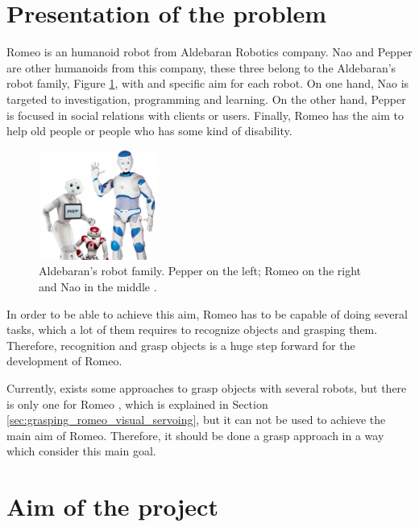 \documentclass[12pt,a4paper,final,twoside,openright]{report}
\begin{document}
\section{Presentation of the problem}

Romeo is an humanoid robot from Aldebaran Robotics company. Nao and Pepper are other humanoids from this company, these three belong to the Aldebaran's robot family, Figure \ref{fig:aldebaran_family}, with and specific aim for each robot. On one hand, Nao is targeted to investigation, programming and learning. On the other hand, Pepper is focused in social relations with clients or users. Finally, Romeo has the aim to help old people or people who has some kind of disability.	

\begin{figure}
	    \centering
		\includegraphics[width=0.35\textwidth]{images/romeo_nao_pepper.jpg}
         \caption{Aldebaran's robot family. Pepper on the left; Romeo on the right and Nao in the middle \autocite{ParPaul}. \label{fig:aldebaran_family}}
\end{figure}

In order to be able to achieve this aim, Romeo has to be capable of doing several tasks, which a lot of them requires to recognize objects and grasping them. Therefore, recognition and grasp objects is a huge step forward for the development of Romeo. 

Currently, exists some approaches to grasp objects with several robots, but there is only one for Romeo  \cite{claudio:hal-01159882}, which is explained in Section \ref{sec:grasping_romeo_visual_servoing}, but it can not be used to achieve the main aim of Romeo. Therefore, it should be done a grasp approach in a way which consider this main goal.  

\section{Aim of the project}
\label{sec:aim_project}
\end{document}
